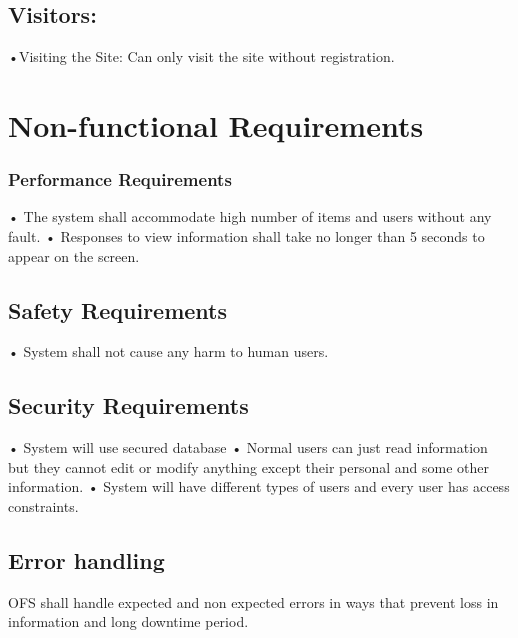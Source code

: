 \documentclass{article}
\begin{document}
	\subsection{Visitors:}
	•Visiting the Site: Can only visit the site without registration.
	
	
	
\section{Non-functional Requirements}
\subsubsection{Performance Requirements}
• The system shall accommodate high number of items and users without any fault.
• Responses to view information shall take no longer than 5 seconds to appear on the screen.
\subsection{Safety Requirements}
• System shall not cause any harm to human users.
\subsection{Security Requirements}
• System will use secured database
• Normal users can just read information but they cannot edit or modify anything except their personal and some other information.
• System will have different types of users and every user has access constraints.
\subsection{Error handling}
OFS shall handle expected and non expected errors in ways that prevent loss in information and long downtime period.
\end{document}
